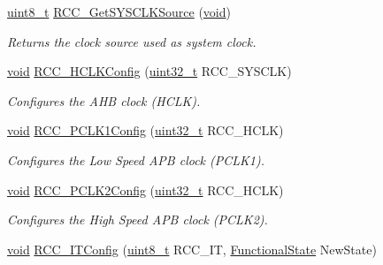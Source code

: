 \begin{DoxyCompactItemize}
\hyperlink{_p_e___types_8h_aba7bc1797add20fe3efdf37ced1182c5}{uint8\+\_\+t} \hyperlink{group___r_c_c___private___functions_gaaeb32311c208b2a980841c9c884a41ea}{R\+C\+C\+\_\+\+Get\+S\+Y\+S\+C\+L\+K\+Source} (\hyperlink{usb__devapi_8h_afabf60e7f57651d6d595a02c75f07cd0}{void})
\begin{DoxyCompactList}\small\item\em Returns the clock source used as system clock. \end{DoxyCompactList}\item 
\hyperlink{usb__devapi_8h_afabf60e7f57651d6d595a02c75f07cd0}{void} \hyperlink{group___r_c_c___private___functions_ga9d0aec72e236c6cdf3a3a82dfb525491}{R\+C\+C\+\_\+\+H\+C\+L\+K\+Config} (\hyperlink{_p_e___types_8h_a33594304e786b158f3fb30289278f5af}{uint32\+\_\+t} R\+C\+C\+\_\+\+S\+Y\+S\+C\+LK)
\begin{DoxyCompactList}\small\item\em Configures the A\+HB clock (H\+C\+LK). \end{DoxyCompactList}\item 
\hyperlink{usb__devapi_8h_afabf60e7f57651d6d595a02c75f07cd0}{void} \hyperlink{group___r_c_c___private___functions_ga448137346d4292985d4e7a61dd1a824f}{R\+C\+C\+\_\+\+P\+C\+L\+K1\+Config} (\hyperlink{_p_e___types_8h_a33594304e786b158f3fb30289278f5af}{uint32\+\_\+t} R\+C\+C\+\_\+\+H\+C\+LK)
\begin{DoxyCompactList}\small\item\em Configures the Low Speed A\+PB clock (P\+C\+L\+K1). \end{DoxyCompactList}\item 
\hyperlink{usb__devapi_8h_afabf60e7f57651d6d595a02c75f07cd0}{void} \hyperlink{group___r_c_c___private___functions_ga09f9c010a4adca9e036da42c2ca6126a}{R\+C\+C\+\_\+\+P\+C\+L\+K2\+Config} (\hyperlink{_p_e___types_8h_a33594304e786b158f3fb30289278f5af}{uint32\+\_\+t} R\+C\+C\+\_\+\+H\+C\+LK)
\begin{DoxyCompactList}\small\item\em Configures the High Speed A\+PB clock (P\+C\+L\+K2). \end{DoxyCompactList}\item 
\hyperlink{usb__devapi_8h_afabf60e7f57651d6d595a02c75f07cd0}{void} \hyperlink{group___r_c_c___private___functions_gaa953aa226e9ce45300d535941e4dfe2f}{R\+C\+C\+\_\+\+I\+T\+Config} (\hyperlink{_p_e___types_8h_aba7bc1797add20fe3efdf37ced1182c5}{uint8\+\_\+t} R\+C\+C\+\_\+\+IT, \hyperlink{agilefox_2library_2inc_2stm32f10x__type_8h_ac9a7e9a35d2513ec15c3b537aaa4fba1}{Functional\+State} New\+State)

\end{DoxyCompactItemize}
